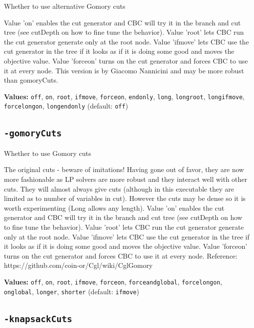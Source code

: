 \documentclass[11pt,a4paper]{article}
\begin{document}
Whether to use alternative Gomory cuts

Value 'on' enables the cut generator and CBC will try it in the branch and cut tree (see cutDepth on how to fine tune the behavior). Value 'root' lets CBC run the cut generator generate only at the root node. Value 'ifmove' lets CBC use the cut generator in the tree if it looks as if it is doing some good and moves the objective value. Value 'forceon' turns on the cut generator and forces CBC to use it at every node.
 This version is by Giacomo Nannicini and may be more robust than gomoryCuts.

\textbf{Values:} \texttt{off}, \texttt{on}, \texttt{root}, \texttt{ifmove}, \texttt{forceon}, \texttt{endonly}, \texttt{long}, \texttt{longroot}, \texttt{longifmove}, \texttt{forcelongon}, \texttt{longendonly} (default: \texttt{off})

\subsection*{\texttt{-gomoryCuts}}

Whether to use Gomory cuts

The original cuts - beware of imitations!  Having gone out of favor, they are now more fashionable as LP solvers are more robust and they interact well with other cuts.  They will almost always give cuts (although in this executable they are limited as to number of variables in cut).  However the cuts may be dense so it is worth experimenting (Long allows any length). Value 'on' enables the cut generator and CBC will try it in the branch and cut tree (see cutDepth on how to fine tune the behavior). Value 'root' lets CBC run the cut generator generate only at the root node. Value 'ifmove' lets CBC use the cut generator in the tree if it looks as if it is doing some good and moves the objective value. Value 'forceon' turns on the cut generator and forces CBC to use it at every node.
 Reference: https://github.com/coin-or/Cgl/wiki/CglGomory

\textbf{Values:} \texttt{off}, \texttt{on}, \texttt{root}, \texttt{ifmove}, \texttt{forceon}, \texttt{forceandglobal}, \texttt{forcelongon}, \texttt{onglobal}, \texttt{longer}, \texttt{shorter} (default: \texttt{ifmove})

\subsection*{\texttt{-knapsackCuts}}
\end{document}
